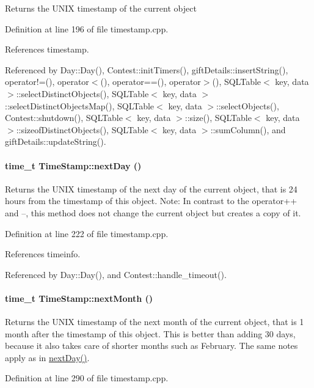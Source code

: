 Returns the UNIX timestamp of the current object 

Definition at line 196 of file timestamp.cpp.

References timestamp.

Referenced by Day::Day(), Contest::init\-Timers(), gift\-Details::insert\-String(), operator!=(), operator$<$(), operator==(), operator$>$(), SQLTable$<$ key, data $>$::select\-Distinct\-Objects(), SQLTable$<$ key, data $>$::select\-Distinct\-Objects\-Map(), SQLTable$<$ key, data $>$::select\-Objects(), Contest::shutdown(), SQLTable$<$ key, data $>$::size(), SQLTable$<$ key, data $>$::sizeof\-Distinct\-Objects(), SQLTable$<$ key, data $>$::sum\-Column(), and gift\-Details::update\-String().\hypertarget{classTimeStamp_TimeStampa16}{
\paragraph[nextDay]{\setlength{\rightskip}{0pt plus 5cm}time\_\-t Time\-Stamp::next\-Day ()}\hfill}
\label{classTimeStamp_TimeStampa16}


Returns the UNIX timestamp of the next day of the current object, that is 24 hours from the timestamp of this object. Note: In contrast to the operator++ and --, this method does not change the current object but creates a copy of it. 

Definition at line 222 of file timestamp.cpp.

References timeinfo.

Referenced by Day::Day(), and Contest::handle\_\-timeout().\hypertarget{classTimeStamp_TimeStampa19}{
\paragraph[nextMonth]{\setlength{\rightskip}{0pt plus 5cm}time\_\-t Time\-Stamp::next\-Month ()}\hfill}
\label{classTimeStamp_TimeStampa19}


Returns the UNIX timestamp of the next month of the current object, that is 1 month after the timestamp of this object. This is better than adding 30 days, because it also takes care of shorter months such as February. The same notes apply as in \hyperlink{classTimeStamp_TimeStampa16}{next\-Day()}. 

Definition at line 290 of file timestamp.cpp.

